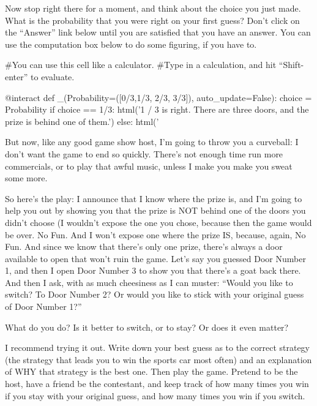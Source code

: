 Now stop right there for a moment, and think about the choice you just
made.  What is the probability that you were right on your first
guess?  Don't click on the ``Answer'' link below until you are
satisfied that you have an answer.  You can use the computation box
below to do some figuring, if you have to.


\begin{sageverbatim}
#You can use this cell like a calculator.  
#Type in a calculation, and hit ``Shift-enter'' to evaluate.
\end{sageverbatim}


\begin{sageverbatim}
@interact
def _(Probability=([0/3,1/3, 2/3, 3/3]), auto_update=False):
    choice = Probability
    if choice == 1/3:
         html('1 / 3 is right.  There are three doors, and the prize is behind one of them.')
    else:
         html('%
\end{sageverbatim}    


But now, like any good game show host, I'm going to throw you a
curveball: I don't want the game to end so quickly.  There's not
enough time run more commercials, or to play that awful music, unless
I make you make you sweat some more. 


So here's the play: I announce that I know where the prize is, and I'm
going to help you out by showing you that the prize is NOT behind one
of the doors you didn't choose (I wouldn't expose the one you chose,
because then the game would be over.  No Fun.  And I won't expose one
where the prize IS, because, again, No Fun. And since we know that
there's only one prize, there's always a door available to open that won't
ruin the game.  Let's say you guessed Door Number 1, and then I open
Door Number 3 to show you that there's a goat back there.  And then
I ask, with as much cheesiness as I can muster: ``Would you like to
switch?  To Door Number 2?  Or would you like to stick with your
original guess of Door Number 1?''


What do you do?  Is it better to switch, or to stay?  Or does it even
matter?


I recommend trying it out.  Write down your best guess as to the
correct strategy (the strategy that leads you to win the sports car
most often) and an explanation of WHY that strategy is the best one.
Then play the game.  Pretend to be the host, have a friend be the
contestant, and keep track of how many times you win if you stay with
your original guess, and how many times you win if you switch.


